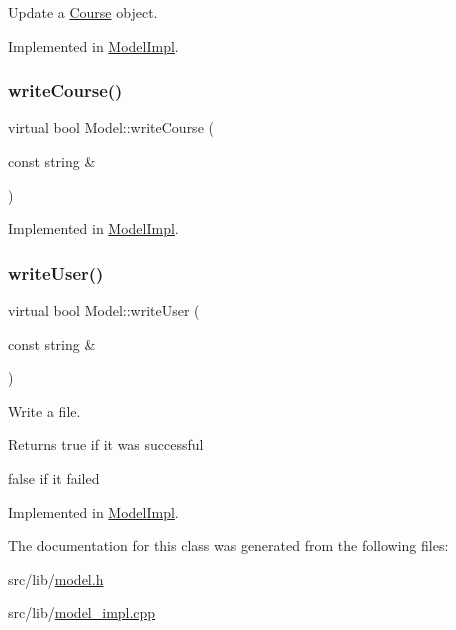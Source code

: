 Update a \hyperlink{classCourse}{Course} object. 



Implemented in \hyperlink{classModelImpl_a8088106fd8837da688f9334ab143db4c}{Model\+Impl}.

\mbox{\label{classModel_a4e75d78a6dc3ded41a44475c3d59aa57}} 
\subsubsection{\texorpdfstring{write\+Course()}{writeCourse()}}
{\footnotesize\ttfamily virtual bool Model\+::write\+Course (\begin{DoxyParamCaption}\item[{const string \&}]{ }\end{DoxyParamCaption})\hspace{0.3cm}{\ttfamily [pure virtual]}}



Implemented in \hyperlink{classModelImpl_a6ce3d79c0b49abe19c034dfb30d023d7}{Model\+Impl}.

\mbox{\label{classModel_ad2d1b50c1c071ad0b7820cf4343b2463}} 
\subsubsection{\texorpdfstring{write\+User()}{writeUser()}}
{\footnotesize\ttfamily virtual bool Model\+::write\+User (\begin{DoxyParamCaption}\item[{const string \&}]{ }\end{DoxyParamCaption})\hspace{0.3cm}{\ttfamily [pure virtual]}}



Write a file. 

\begin{DoxyReturn}{Returns}
true if it was successful 

false if it failed 
\end{DoxyReturn}


Implemented in \hyperlink{classModelImpl_a42b5948a513af3e20645cdb63fb6be76}{Model\+Impl}.



The documentation for this class was generated from the following files\+:\begin{DoxyCompactItemize}
\item 
src/lib/\hyperlink{model_8h}{model.\+h}\item 
src/lib/\hyperlink{model__impl_8cpp}{model\+\_\+impl.\+cpp}\end{DoxyCompactItemize}
